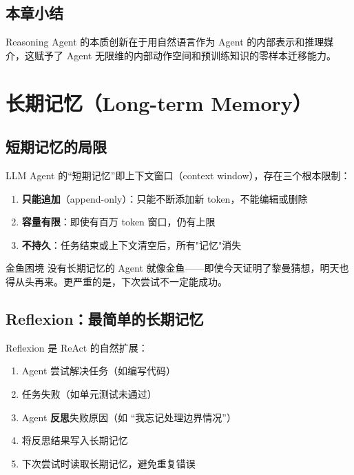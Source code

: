 \documentclass[a4paper]{article}
\begin{document}
\subsection{本章小结}

Reasoning Agent 的本质创新在于用自然语言作为 Agent 的内部表示和推理媒介，这赋予了 Agent 无限维的内部动作空间和预训练知识的零样本迁移能力。

\section{长期记忆（Long-term Memory）}

\subsection{短期记忆的局限}

LLM Agent 的``短期记忆''即上下文窗口（context window），存在三个根本限制：

\begin{enumerate}
    \item \textbf{只能追加}（append-only）：只能不断添加新 token，不能编辑或删除
    \item \textbf{容量有限}：即使有百万 token 窗口，仍有上限
    \item \textbf{不持久}：任务结束或上下文清空后，所有"记忆"消失
\end{enumerate}

\begin{warningbox}{金鱼困境}
没有长期记忆的 Agent 就像金鱼——即使今天证明了黎曼猜想，明天也得从头再来。更严重的是，下次尝试不一定能成功。
\end{warningbox}

\subsection{Reflexion：最简单的长期记忆}

Reflexion 是 ReAct 的自然扩展：

\begin{enumerate}
    \item Agent 尝试解决任务（如编写代码）
    \item 任务失败（如单元测试未通过）
    \item Agent \textbf{反思}失败原因（如 ``我忘记处理边界情况''）
    \item 将反思结果写入长期记忆
    \item 下次尝试时读取长期记忆，避免重复错误
\end{enumerate}
\end{document}
